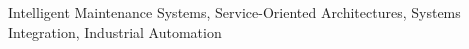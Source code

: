 \documentclass[oneside,diss]{deletex}
\title{\disstitle}
\author{Giacomolli}{Anderson Antônio}
\date{março}{2014}
\begin{document}

\maketitle





\begin{abstract}
  
\end{abstract}

\begin{englishabstract}{Intelligent Maintenance Systems, Service-Oriented Architectures, Systems
    Integration, Industrial Automation}
  
\end{englishabstract}

\listoffigures

\listoftables


\end{document}
